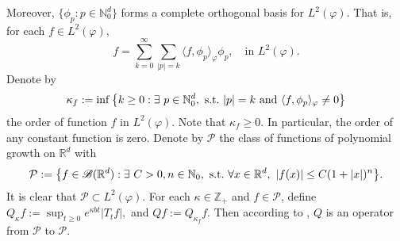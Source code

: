 \documentclass[12pt,oneside,english]{amsart}
\theoremstyle{plain}
\theoremstyle{definition}
\numberwithin{equation}{section}
\begin{document}
    Moreover, $\{\phi_p: p \in \mathbb N_0^d\}$ forms a complete orthogonal basis for $L^2(\varphi)$.
    That is, for each $f\in L^2(\varphi)$,
\begin{equation}\label{semicomp1}
    f
    =\sum_{k=0}^{\infty}\sum_{|p|=k}\langle f, \phi_p \rangle_{\varphi} \phi_p,
    \quad \text{in~} L^2(\varphi).
\end{equation}
    Denote by
\begin{equation}\label{order}
    \kappa_f
    :=\inf \left \{k\geq 0: \exists ~ p\in \mathbb N_0^d ,{\rm ~s.t.~}|p|=k {\rm ~and~}  \langle f, \phi_p \rangle_{\varphi}\neq 0\right \}
\end{equation}
    the order of function $f$ in $L^2(\varphi)$.
    Note that $ \kappa_f\geq 0$.
    In particular, the order of any constant function is zero.
    Denote by $\mathcal P$ the class of functions of polynomial growth on $\mathbb R^d$ with
\begin{equation}
    \mathcal{P}
    :=\big \{f\in \mathscr B(\mathbb{R}^d):\exists~ C>0, n \in \mathbb N_0, {\rm ~s.t.~} \forall x\in \mathbb{R}^d,~ |f(x)|\leq C(1+|x|)^n\big\}.
\end{equation}
    It is clear that $\mathcal{P} \subset L^2(\varphi)$.
    For each $\kappa \in \mathbb Z_+$ and $f\in \mathcal P$, define
$
	Q_\kappa f := \sup_{t\geq 0} e^{\kappa b t}|T_t f|,
$
and
$
	Q f:= Q_{\kappa_f}f.
$
    Then according to \cite[Fact 1.2]{MM}, $Q$ is an operator from $\mathcal P$ to $\mathcal P$.
\begin{comment}

	\deleted{
	For each $\kappa\geq0$, define $\mathcal{P}_{\kappa}$ by
	\begin{align}
	     \mathcal{P}_{\kappa}
    :=\big \{f\in \mathcal{P}:\exists~ C>0, n \in \mathbb N_0, {\rm ~s.t.~} \forall x\in \mathbb{R}^d,~ \sup_{t\geq0}e^{\kappa b t}|T_tf(x)|\leq C(1+|x|)^n\big\}.
	\end{align}
	and an operator $Q_{\kappa}:\mathcal{P}_{\kappa}\mapsto\mathcal{P}\cap\mathscr{B}(\mathbb{R}^d,\mathbb{R}_+)$ by $Q_{\kappa}f=\sup_{t\geq0}e^{\kappa b t}|T_tf|$.
	Then
	\begin{itemize}
	    \item For each $\kappa_1\geq \kappa_2$, $\mathcal{P}_{\kappa_1}\subset\mathcal{P}_{\kappa_2}$, and $\mathcal{P}=\cup_{\kappa\geq 0}\mathcal{P}_{\kappa}$.
	    \item for each $f\in \mathcal{P}$, then $f\in \mathcal{P}_{\kappa_f}$, and $Q_{\kappa}f\leq Qf:=Q_{\kappa_f}f$, $\kappa\leq \kappa_f$.

	\end{itemize}
	}
\end{comment}
\end{document}
